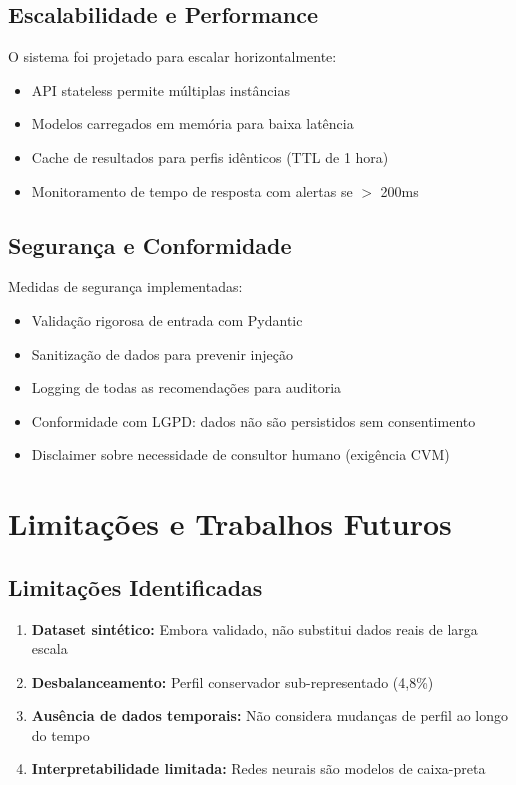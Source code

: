 \subsection{Escalabilidade e Performance}

O sistema foi projetado para escalar horizontalmente:

\begin{itemize}
    \item API stateless permite múltiplas instâncias
    \item Modelos carregados em memória para baixa latência
    \item Cache de resultados para perfis idênticos (TTL de 1 hora)
    \item Monitoramento de tempo de resposta com alertas se $>$ 200ms
\end{itemize}

\subsection{Segurança e Conformidade}

Medidas de segurança implementadas:

\begin{itemize}
    \item Validação rigorosa de entrada com Pydantic
    \item Sanitização de dados para prevenir injeção
    \item Logging de todas as recomendações para auditoria
    \item Conformidade com LGPD: dados não são persistidos sem consentimento
    \item Disclaimer sobre necessidade de consultor humano (exigência CVM)
\end{itemize}

\section{Limitações e Trabalhos Futuros}

\subsection{Limitações Identificadas}

\begin{enumerate}
    \item \textbf{Dataset sintético:} Embora validado, não substitui dados reais de larga escala
    \item \textbf{Desbalanceamento:} Perfil conservador sub-representado (4,8\%)
    \item \textbf{Ausência de dados temporais:} Não considera mudanças de perfil ao longo do tempo
    \item \textbf{Interpretabilidade limitada:} Redes neurais são modelos de caixa-preta
\end{enumerate}


